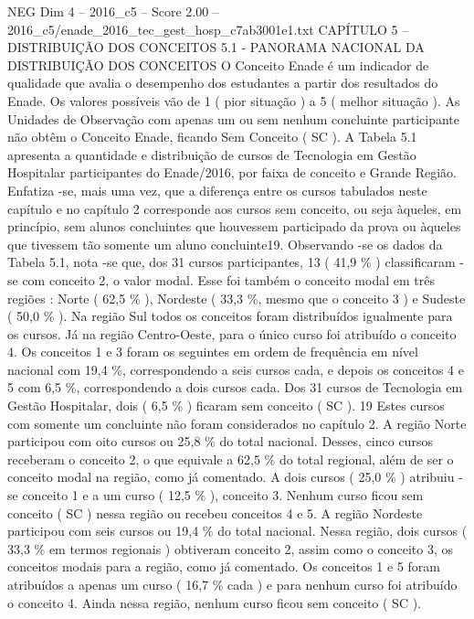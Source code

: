 \begin{textsample}{NEG Dim 4 – 2016\_c5 – Score 2.00 – 2016\_c5/enade\_2016\_tec\_gest\_hosp\_c7ab3001e1.txt}  \label{ex:f4_neg_255}
CAPÍTULO 5 – DISTRIBUIÇÃO DOS CONCEITOS 5.1 - PANORAMA NACIONAL DA DISTRIBUIÇÃO DOS CONCEITOS O Conceito Enade é um indicador de qualidade que avalia o desempenho dos estudantes a partir dos resultados do Enade.
Os valores possíveis vão de 1 ( pior situação ) a 5 ( melhor situação ).
As Unidades de Observação com apenas um ou sem nenhum concluinte participante não obtêm o Conceito Enade, ficando Sem Conceito ( SC ).
A Tabela 5.1 apresenta a quantidade e distribuição de cursos de Tecnologia em Gestão Hospitalar participantes do Enade/2016, por faixa de conceito e Grande Região.
Enfatiza -se, mais uma vez, que a diferença entre os cursos tabulados neste capítulo e no capítulo 2 corresponde aos cursos sem conceito, ou seja àqueles, em princípio, sem alunos concluintes que houvessem participado da prova ou àqueles que tivessem tão somente um aluno concluinte19.
Observando -se os dados da Tabela 5.1, nota -se que, dos 31 cursos participantes, 13 ( 41,9 \% ) classificaram -se com conceito 2, o valor modal.
Esse foi também o conceito modal em três regiões : Norte ( 62,5 \% ), Nordeste ( 33,3 \%, mesmo que o conceito 3 ) e Sudeste ( 50,0 \% ).
Na região Sul todos os conceitos foram distribuídos igualmente para os cursos.
Já na região Centro-Oeste, para o único curso foi atribuído o conceito 4.
Os conceitos 1 e 3 foram os seguintes em ordem de frequência em nível nacional com 19,4 \%, correspondendo a seis cursos cada, e depois os conceitos 4 e 5 com 6,5 \%, correspondendo a dois cursos cada.
Dos 31 cursos de Tecnologia em Gestão Hospitalar, dois ( 6,5 \% ) ficaram sem conceito ( SC ). 19 Estes cursos com somente um concluinte não foram considerados no capítulo 2.
A região Norte participou com oito cursos ou 25,8 \% do total nacional.
Desses, cinco cursos receberam o conceito 2, o que equivale a 62,5 \% do total regional, além de ser o conceito modal na região, como já comentado.
A dois cursos ( 25,0 \% ) atribuiu -se conceito 1 e a um curso ( 12,5 \% ), conceito 3.
Nenhum curso ficou sem conceito ( SC ) nessa região ou recebeu conceitos 4 e 5.
A região Nordeste participou com seis cursos ou 19,4 \% do total nacional.
Nessa região, dois cursos ( 33,3 \% em termos regionais ) obtiveram conceito 2, assim como o conceito 3, os conceitos modais para a região, como já comentado.
Os conceitos 1 e 5 foram atribuídos a apenas um curso ( 16,7 \% cada ) e para nenhum curso foi atribuído o conceito 4.
Ainda nessa região, nenhum curso ficou sem conceito ( SC ).

\end{textsample}
